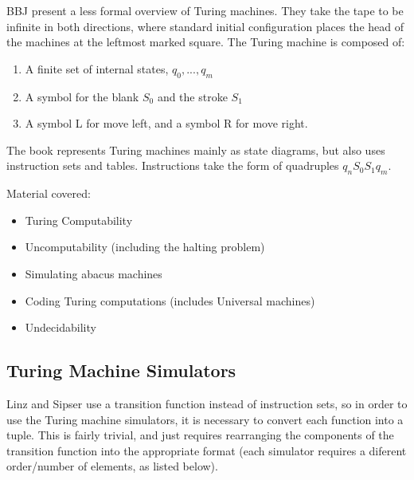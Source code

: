 \documentclass[../../include/open-logic-section]{subfiles}
\begin{document}
BBJ present a less formal overview of Turing machines. They take the tape to be infinite in both directions, where standard initial configuration places the head of the machines at the leftmost marked square. The Turing machine is composed of:
\begin{enumerate}
\item A finite set of internal states, $q_0, ..., q_m$
\item A symbol for the blank $S_0$ and the stroke $S_1$
\item A symbol L for move left, and a symbol R for move right. 
\end{enumerate}

The book represents Turing machines mainly as state diagrams, but also uses instruction sets and tables. Instructions take the form of quadruples $q_n S_0 S_1 q_m$.

Material covered:
\begin{itemize}
\item Turing Computability 
\item Uncomputability (including the halting problem)
\item Simulating abacus machines
\item Coding Turing computations (includes Universal machines)
\item Undecidability
\end{itemize}

\subsection{Turing Machine Simulators}
Linz and Sipser use a transition function instead of instruction sets, so in order to use the Turing machine simulators, it is necessary to convert each function into a tuple. This is fairly trivial, and just requires rearranging the components of the transition function into the appropriate format (each simulator requires a diferent order/number of elements, as listed below).
\end{document}
